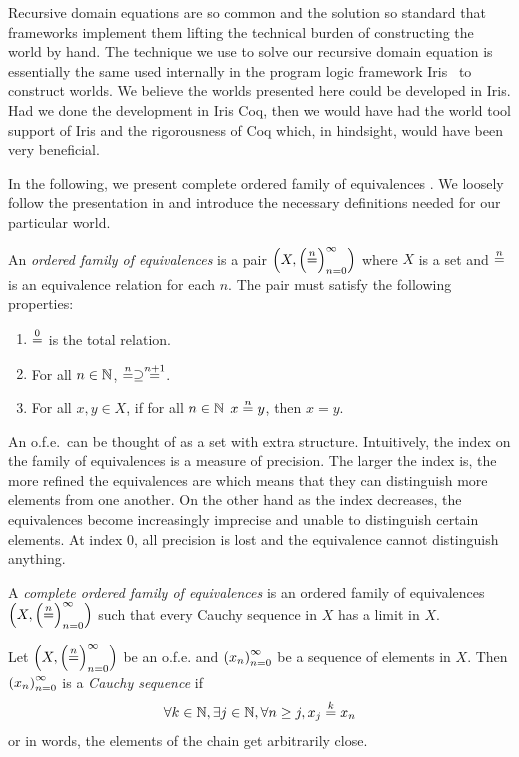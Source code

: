 \begin{jversion}
Recursive domain equations are so common and the solution so standard that frameworks implement them lifting the technical burden of constructing the world by hand.
The technique we use to solve our recursive domain equation is essentially the same used internally in the program logic framework Iris~\citep{iris,iris2,iris3} to construct worlds.
We believe the worlds presented here could be developed in Iris.
Had we done the development in Iris Coq, then we would have had the world tool support of Iris and the rigorousness of Coq which, in hindsight, would have been very beneficial.

In the following, we present complete ordered family of equivalences \citep{di_gianantonio_2002}.
We loosely follow the presentation in \citet{birkedal_taste_2014} and introduce the necessary definitions needed for our particular world.
\begin{definition}
An \emph{ordered family of equivalences} is a pair $\cofe{X}$ where $X$ is a set and $\nequal$ is an equivalence relation for each $n$.
The pair must satisfy the following properties:
\begin{enumerate}
\item $\nequal[0]$ is the total relation.
\item For all $n \in \nats$, $\nequal[n] \supseteq \nequal[n+1]$.
\item For all $x,y \in X$,  if for all $n \in \nats$ $x \nequal y$, then $x = y$.
\end{enumerate}
\end{definition}
\noindent An o.f.e.\ can be thought of as a set with extra structure.
Intuitively, the index on the family of equivalences is a measure of precision.
The larger the index is, the more refined the equivalences are which means that they can distinguish more elements from one another.
On the other hand as the index decreases, the equivalences become increasingly imprecise and unable to distinguish certain elements.
At index 0, all precision is lost and the equivalence cannot distinguish anything.
\begin{definition}
  \label{def:cauchy-sequence}
  A \emph{complete ordered family of equivalences} is an ordered family of equivalences
  $\cofe{X}$ such that every Cauchy sequence in $X$ has a limit
  in $X$.

  Let $\cofe{X}$ be an o.f.e. and $\seq{x}$ be a sequence of
  elements in $X$. Then $\seq{x}$ is a \emph{Cauchy sequence} if
  \begin{align*}
    \forall k \in \nats, \exists j \in \nats, \forall n \geq j, x_j \nequal[k] x_n
  \end{align*}
  or in words, the elements of the chain get arbitrarily close.


\end{definition}
\end{jversion}
